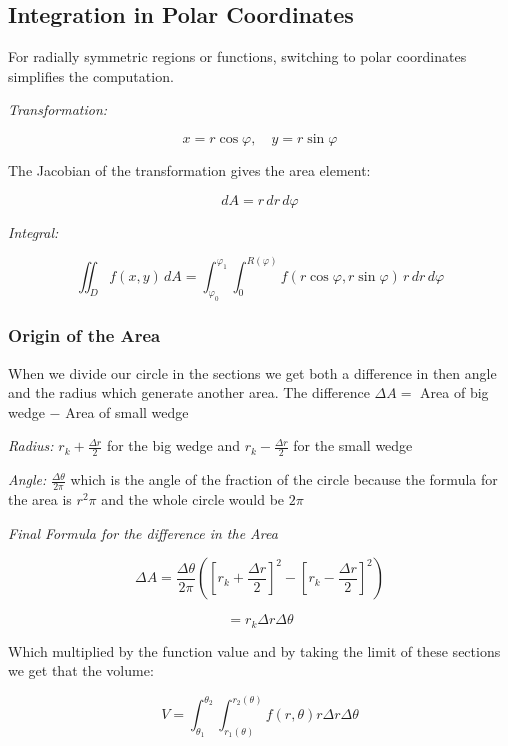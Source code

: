 \subsection{Integration in Polar Coordinates}

For radially symmetric regions or functions, switching to polar coordinates simplifies the computation.
\vspace{\baselineskip}

\emph{Transformation:}

\[
    x = r \cos \varphi, \quad y = r \sin \varphi
\]

The Jacobian of the transformation gives the area element:

\[
    dA = r\, dr\, d\varphi
\]


\emph{Integral:}

\[
    \iint_D f(x, y)\, dA = \int_{\varphi_0}^{\varphi_1} \int_{0}^{R(\varphi)} f(r \cos \varphi, r \sin \varphi)\, r\, dr\, d\varphi
\]

\subsubsection{Origin of the Area}

When we divide our circle in the sections we get both a difference in then angle and the radius which generate another area.
The difference \(\Delta A =\) Area of big wedge \(-\) Area of small wedge
\vspace{\baselineskip}

\emph{Radius: }\(r_k + \frac{\Delta r}{2}\) for the big wedge and \(r_k - \frac{\Delta r}{2}\) for the small wedge
\vspace{\baselineskip}

\emph{Angle: }\(\frac{\Delta \theta}{2 \pi}\) which is the angle of the fraction of the circle because the formula for the area is \(r^2 \pi\)
and the whole circle would be \(2\pi\)
\vspace{\baselineskip}

\emph{Final Formula for the difference in the Area}

\[
    \Delta A = \frac{\Delta \theta}{2 \pi} \left ( {\left[r_k + \frac{\Delta r}{2}\right]}^2 - 
    {\left[r_k - \frac{\Delta r}{2}\right]}^2\right)
\] 

\[ 
    = r_k \Delta r \Delta \theta
\]

Which multiplied by the function value and by taking the limit of these sections we get that the volume:

\[
    V = \int_{\theta_1}^{\theta_2} \int_{r_1 (\theta)}^{r_2 (\theta)} f(r, \theta) r \Delta r \Delta \theta
\]


